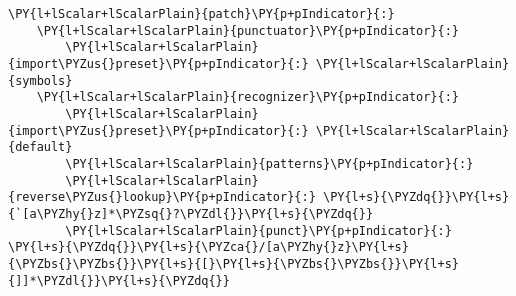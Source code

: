 \begin{Verbatim}[commandchars=\\\{\}]
\PY{l+lScalar+lScalarPlain}{patch}\PY{p+pIndicator}{:}
    \PY{l+lScalar+lScalarPlain}{punctuator}\PY{p+pIndicator}{:}
        \PY{l+lScalar+lScalarPlain}{import\PYZus{}preset}\PY{p+pIndicator}{:} \PY{l+lScalar+lScalarPlain}{symbols}
    \PY{l+lScalar+lScalarPlain}{recognizer}\PY{p+pIndicator}{:}
        \PY{l+lScalar+lScalarPlain}{import\PYZus{}preset}\PY{p+pIndicator}{:} \PY{l+lScalar+lScalarPlain}{default}
        \PY{l+lScalar+lScalarPlain}{patterns}\PY{p+pIndicator}{:}
        \PY{l+lScalar+lScalarPlain}{reverse\PYZus{}lookup}\PY{p+pIndicator}{:} \PY{l+s}{\PYZdq{}}\PY{l+s}{`[a\PYZhy{}z]*\PYZsq{}?\PYZdl{}}\PY{l+s}{\PYZdq{}}
        \PY{l+lScalar+lScalarPlain}{punct}\PY{p+pIndicator}{:} \PY{l+s}{\PYZdq{}}\PY{l+s}{\PYZca{}/[a\PYZhy{}z}\PY{l+s}{\PYZbs{}\PYZbs{}}\PY{l+s}{[}\PY{l+s}{\PYZbs{}\PYZbs{}}\PY{l+s}{]]*\PYZdl{}}\PY{l+s}{\PYZdq{}}
\end{Verbatim}
